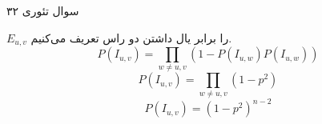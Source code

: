 سوال تئوری ۳۲

$E_{u, v}$
را برابر یال داشتن دو راس تعریف می‌کنیم.
$$P(I_{u, v}) = \displaystyle\prod_{w \neq u, v} (1-P(I_{u, w})P(I_{u, w}))$$
$$P(I_{u, v}) = \displaystyle\prod_{w \neq u, v} (1-p^2)$$
$$P(I_{u, v}) = (1-p^2)^{n-2}$$